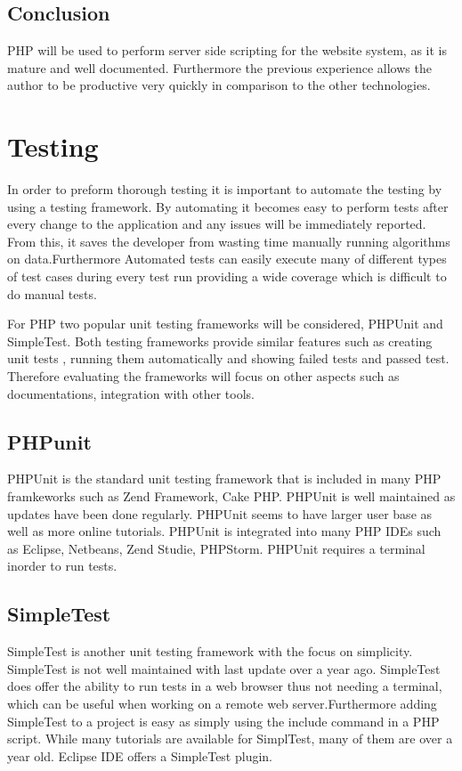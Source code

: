 \documentclass[a4paper,oneside,11pt]{report}
\begin{document}
\subsection{Conclusion}
PHP will be used to perform server side scripting for the website system, as it is mature and well documented. Furthermore the previous experience allows the author to be productive very quickly in comparison to the other technologies.
\section{Testing}
In order to preform thorough testing it is important to automate the testing by using a testing framework. By automating it becomes easy to perform tests after every change to the application and any issues will be immediately reported. From this, it saves the developer from wasting time manually running algorithms on data.Furthermore Automated tests can easily execute many of different types of test cases during every test run providing a wide coverage which is difficult to do manual tests.

For PHP two popular unit testing frameworks will be considered, PHPUnit and SimpleTest. Both testing frameworks provide similar features such as creating unit tests , running them automatically and showing failed tests and passed test. Therefore evaluating the frameworks will focus on other aspects such as documentations, integration with other tools.
\subsection{PHPunit}
PHPUnit is the standard unit testing framework that is included in many PHP framkeworks such as Zend Framework, Cake PHP. PHPUnit is well maintained as   updates have been done regularly. PHPUnit seems to have larger user base as well as more online tutorials. PHPUnit is integrated into many PHP IDEs  such as Eclipse, Netbeans, Zend Studie, PHPStorm. PHPUnit requires a terminal inorder to run tests.
\subsection{SimpleTest}
SimpleTest is another unit testing framework with the focus on simplicity. SimpleTest is not well maintained with last update over a year ago. SimpleTest does offer the ability to run tests in a web browser thus not needing a terminal, which can be useful when working on a remote web server.Furthermore adding SimpleTest to a project is easy as simply using the include command in a PHP script. While many tutorials are available for SimplTest, many of them are over a year  old. Eclipse IDE offers a SimpleTest plugin.
\end{document}
